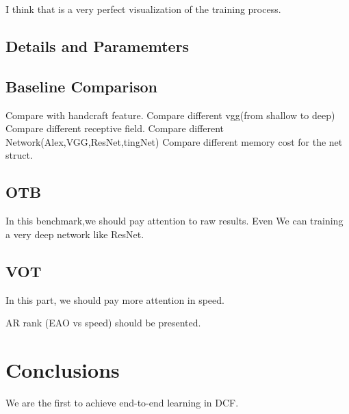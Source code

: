 \documentclass[11pt]{article}
\begin{document}
I think that is a very perfect visualization of the training process.


\subsection{Details and Paramemters}


\subsection{Baseline Comparison}
Compare with handcraft feature.
Compare different vgg(from shallow to deep)
Compare different receptive field.
Compare different Network(Alex,VGG,ResNet,tingNet)
Compare different memory cost for the net struct.


\subsection{OTB}
In this benchmark,we should pay attention to raw results. Even We can training a very deep network like ResNet.

\subsection{VOT}
In this part, we should pay more attention in speed. 

AR rank 
(EAO  vs speed)  should be presented.


\section{Conclusions}
We are the first to achieve end-to-end learning in DCF.

\pagebreak		


\end{document}
